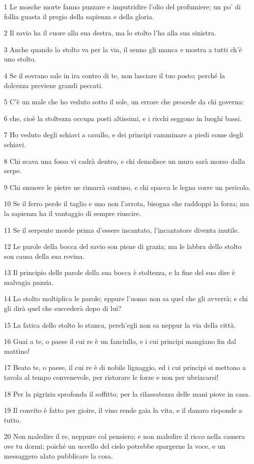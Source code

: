 \par 1 Le mosche morte fanno puzzare e imputridire l'olio del profumiere; un po' di follia guasta il pregio della sapienza e della gloria.
\par 2 Il savio ha il cuore alla sua destra, ma lo stolto l'ha alla sua sinistra.
\par 3 Anche quando lo stolto va per la via, il senno gli manca e mostra a tutti ch'è uno stolto.
\par 4 Se il sovrano sale in ira contro di te, non lasciare il tuo posto; perché la dolcezza previene grandi peccati.
\par 5 C'è un male che ho veduto sotto il sole, un errore che procede da chi governa:
\par 6 che, cioè la stoltezza occupa posti altissimi, e i ricchi seggono in luoghi bassi.
\par 7 Ho veduto degli schiavi a cavallo, e dei principi camminare a piedi come degli schiavi.
\par 8 Chi scava una fossa vi cadrà dentro, e chi demolisce un muro sarà morso dalla serpe.
\par 9 Chi smuove le pietre ne rimarrà contuso, e chi spacca le legna corre un pericolo.
\par 10 Se il ferro perde il taglio e uno non l'arrota, bisogna che raddoppi la forza; ma la sapienza ha il vantaggio di sempre riuscire.
\par 11 Se il serpente morde prima d'essere incantato, l'incantatore diventa inutile.
\par 12 Le parole della bocca del savio son piene di grazia; ma le labbra dello stolto son causa della sua rovina.
\par 13 Il principio delle parole della sua bocca è stoltezza, e la fine del suo dire è malvagia pazzia.
\par 14 Lo stolto moltiplica le parole; eppure l'uomo non sa quel che gli avverrà; e chi gli dirà quel che succederà dopo di lui?
\par 15 La fatica dello stolto lo stanca, perch'egli non sa neppur la via della città.
\par 16 Guai a te, o paese il cui re è un fanciullo, e i cui principi mangiano fin dal mattino!
\par 17 Beato te, o paese, il cui re è di nobile lignaggio, ed i cui principi si mettono a tavola al tempo convenevole, per ristorare le forze e non per ubriacarsi!
\par 18 Per la pigrizia sprofonda il soffitto; per la rilassatezza delle mani piove in casa.
\par 19 Il convito è fatto per gioire, il vino rende gaia la vita, e il danaro risponde a tutto.
\par 20 Non maledire il re, neppure col pensiero; e non maledire il ricco nella camera ove tu dormi; poiché un uccello del cielo potrebbe spargerne la voce, e un messaggero alato pubblicare la cosa.

